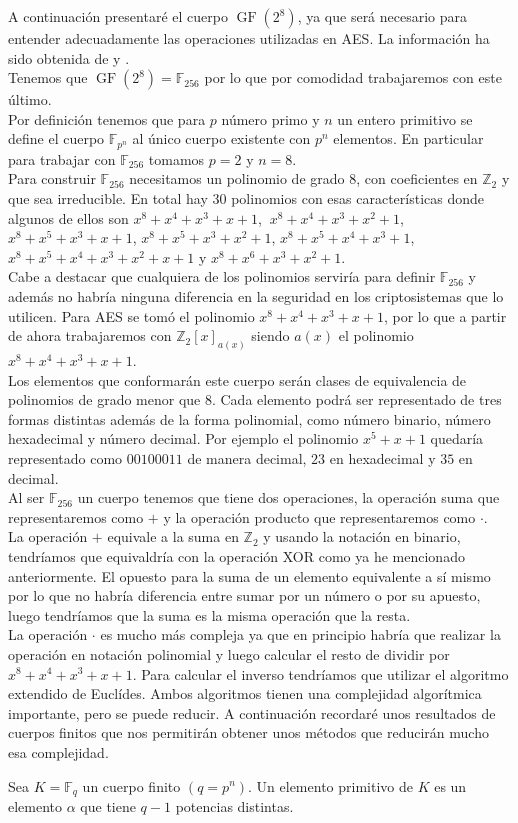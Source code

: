 A continuación presentaré el cuerpo $\operatorname{GF}(2^8)$, ya que será necesario para entender adecuadamente las operaciones utilizadas en AES. La información ha sido obtenida de \cite{criptografia} y \cite{dem1}.\\
Tenemos que $\operatorname{GF}(2^8)=\mathbb{F}_{256}$ por lo que por comodidad trabajaremos con este último.\\
Por definición tenemos que para $p$ número primo y $n$ un entero primitivo se define el cuerpo $\mathbb{F}_{p^n}$ al único cuerpo existente con $p^n$ elementos. En particular para trabajar con $\mathbb{F}_{256}$ tomamos $p=2$ y $n=8$.\\
Para construir $\mathbb{F}_{256}$ necesitamos un polinomio de grado 8, con coeficientes en $\mathbb{Z}_2$ y que sea irreducible. En total hay 30 polinomios con esas características donde algunos de ellos son 
$x^8+x^4+x^3+x+1$, $\:x^8+x^4+x^3+x^2+1$, $x^8+x^5+x^3+x+1$, $x^8+x^5+x^3+x^2+1$, $x^8+x^5+x^4+x^3+1$, $x^8+x^5+x^4+x^3+x^2+x+1$ y $x^8+x^6+x^3+x^2+1$.\\ 
Cabe a destacar que cualquiera de los polinomios serviría para definir $\mathbb{F}_{256}$ y además no habría ninguna diferencia en la seguridad en los criptosistemas que lo utilicen. 
Para AES se tomó el polinomio $x^8+x^4+x^3+x+1$, por lo que a partir de ahora trabajaremos con $\mathbb{Z}_2[x]_{a(x)}$ siendo $a(x)$ el polinomio $x^8+x^4+x^3+x+1$.\\
Los elementos que conformarán este cuerpo serán clases de equivalencia de polinomios  de grado menor que 8. Cada elemento podrá ser representado de tres formas distintas además de la forma polinomial, como número binario, número hexadecimal y número decimal. Por ejemplo el polinomio $x^5+x+1$ quedaría representado como $00100011$ de manera decimal, $23$ en hexadecimal y $35$ en decimal.\\
Al ser $\mathbb{F}_{256}$ un cuerpo tenemos que tiene dos operaciones, la operación suma que representaremos como $+$ y la operación producto que representaremos como $\cdot$.\\
La operación $+$ equivale a la suma en $\mathbb{Z}_2$ y usando la notación en binario, tendríamos que equivaldría con la operación XOR como ya he mencionado anteriormente. El opuesto para la suma de un elemento equivalente a sí mismo por lo que no habría diferencia entre sumar por un número o por su apuesto, luego tendríamos que la suma es la misma operación que la resta.\\
La operación $\cdot$  es mucho más compleja ya que en principio habría que realizar la operación en notación polinomial y luego calcular el resto de dividir por $x^8+x^4+x^3+x+1$. Para calcular el inverso tendríamos que utilizar el algoritmo extendido de Euclídes. Ambos algoritmos tienen una complejidad algorítmica importante, pero se puede reducir. A continuación recordaré unos resultados de cuerpos finitos que nos permitirán obtener unos métodos que reducirán mucho esa complejidad.\\
\begin{definicion}
	Sea $K=\mathbb{F}_q$ un cuerpo finito $(q=p^n)$. Un elemento primitivo de $K$ es un elemento $\alpha$ que tiene $q-1$ potencias distintas.
\end{definicion}

